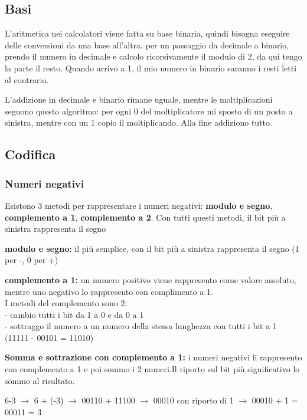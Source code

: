 \documentclass[12pt, a4paper]{article}
\begin{document}
\subsection{Basi}
 L'aritmetica nei calcolatori viene fatta su base binaria, quindi bisogna eseguire delle conversioni da una base all'altra.
 per un passaggio da decimale a binario, prendo il numero in decimale e calcolo ricorsivamente il modulo di 2, da qui tengo la parte il resto.
 Quando arrivo a 1, il mio numero in binario saranno i resti letti al contrario.
 
 L'addizione in decimale e binario rimane uguale, mentre le moltiplicazioni seguono questo algoritmo: per ogni 0 del moltiplicatore
 mi sposto di un posto a sinistra, mentre con un 1 copio il moltiplicando. Alla fine addiziono tutto.

\subsection{Codifica}
\subsubsection{Numeri negativi}
Esistono 3 metodi per rappresentare i numeri negativi: \textbf{modulo e segno}, \textbf{complemento a 1}, \textbf{complemento a 2}. 
Con tutti questi metodi, il bit più a sinistra rappresenta il segno

\textbf{modulo e segno:} il più semplice, con il bit più a sinistra rappresenta il segno (1 per -, 0 per +)

\textbf{complemento a 1:} un numero positivo viene rappresento come valore assoluto, mentre uno negativo
 lo rappresento con complimento a 1. \\
    I metodi del complemento sono 2:\\
    - cambio tutti i bit da 1 a 0 e da 0 a 1\\
    - sottraggo il numero a un numero della stessa lunghezza con tutti i bit a 1 
    (11111 - 00101 = 11010)
   
\textbf{Somma e sottrazione con complemento a 1:}
    i numeri negativi li rappresento con complemento a 1 e poi sommo i 2 numeri.Il riporto sul bit più significativo
    lo sommo al risultato. 
    \begin{center}
         6-3 $\rightarrow$ 6 + (-3) $\rightarrow$ 00110 + 11100 $\rightarrow$ 00010 con riporto di 1 $\rightarrow$
         00010 + 1 = 00011 = 3
    \end{center}
\end{document}
